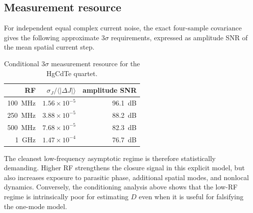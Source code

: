 \documentclass[11pt]{article}
\begin{document}
\subsection{Measurement resource}

For independent equal complex current noise, the exact four-sample covariance gives the following approximate $3\sigma$ requirements, expressed as amplitude SNR of the mean spatial current step.
\begin{table}[H]
\centering
\caption{Conditional $3\sigma$ measurement resource for the HgCdTe quartet.}
\begin{tabular}{rrr}
\toprule
RF & $\sigma_J/\langle|\Delta J|\rangle$ & amplitude SNR \\
\midrule
\SI{100}{MHz} & $1.56\times10^{-5}$ & \SI{96.1}{dB} \\
\SI{250}{MHz} & $3.88\times10^{-5}$ & \SI{88.2}{dB} \\
\SI{500}{MHz} & $7.68\times10^{-5}$ & \SI{82.3}{dB} \\
\SI{1}{GHz} & $1.47\times10^{-4}$ & \SI{76.7}{dB} \\
\bottomrule
\end{tabular}
\end{table}
The cleanest low-frequency asymptotic regime is therefore statistically demanding. Higher RF strengthens the closure signal in this explicit model, but also increases exposure to parasitic phase, additional spatial modes, and nonlocal dynamics. Conversely, the conditioning analysis above shows that the low-RF regime is intrinsically poor for estimating $D$ even when it is useful for falsifying the one-mode model.
\end{document}
